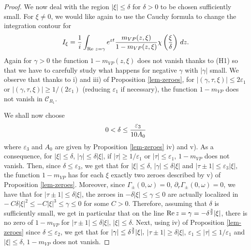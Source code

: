 \documentclass[11pt]{amsart}
\numberwithin{equation}{section}
\newcommand{\eps}{\varepsilon}
\begin{document}
    \begin{proof}
     We now deal with the region $| \xi| \leq \delta$ for $\delta>0$ to be chosen sufficiently small.     
      For $\xi\neq 0$, we would like again to use the Cauchy formula to change the integration contour for 
     $$  I_{\xi}=  { 1 \over i } \int_{\operatorname{Re}\, z= \gamma }   e^{z t } { m_{VP}(z,\xi) \over 1-m_{VP}(z, \xi)}
   \chi \left({\xi \over \delta} \right) \, dz .$$
   Again for $\gamma >0$ the function  $1-m_{VP}(z, \xi)$ does not vanish thanks to (H1) so that
   we have to carefully study what happens for negative $\gamma$ with  $|\gamma|$ small. 
    We observe that  thanks to i) and iii) of Proposition \ref{lem-zeroes}, for $|(\gamma, \tau, \xi)| \leq 2 \eps_{1}$ or  $|(\gamma, \tau, \xi)| \geq 1/ (2\eps_{1})$ (reducing
   $\eps_{1}$ if necessary), the function
    $1-m_{VP}$ does not vanish in $\mathcal{C}_{R_{1}}$.
    
    We shall now choose
   \begin{equation}
   \label{choixdelta} 
  0 < \delta  \leq  {\eps_{3} \over  10 A_0}
   \end{equation}
   where  $\eps_{3}$ and $A_0$ are given by Proposition \ref{lem-zeroes} iv) and v). As a consequence, for $| \xi | \leq \delta$, $|\gamma| \leq \delta  | \xi| $,  if $| \tau| \geq 1/\eps_{1}$ or $|\tau| \leq \eps_{1}$, 
    $1-m_{VP}$ does not vanish.
   Then, since $\delta \leq \eps_{3}$, we get that 
    for  $| \xi | \leq \delta $,   $|\gamma| \leq \delta |\xi|$ and $|\tau \pm 1 | \leq  \eps_3 | \xi|, $
    the function  $  1-m_{VP} $ has for  each $\xi$  exactly two zeroes  described by  v) of Proposition
   \ref{lem-zeroes}. Moreover, since $\Gamma_{\pm}(0, \omega)= 0$, $\partial_{r} \Gamma_{\pm}(0, \omega)= 0$, 
     we  have that for  $|\tau \pm 1 | \leq \delta  | \xi|$,  the zeroes in  $-\delta | \xi |  \leq \gamma \leq 0$
     are actually localized in   $-\ C\delta | \xi |^2 \leq - C |\xi|^3 \leq \gamma \leq 0$ for some $C>0$.
      Therefore, assuming that $\delta$ is sufficiently small, we get in particular that on the line 
        $\operatorname{Re} z =  \gamma = - \delta^{3\over 2}|\xi|$,  there is no zero of $ 1 - m_{VP}$ for   $|\tau \pm 1| \leq \delta | \xi|$, $|\xi| \leq \delta$.
        Next, using   iv) of Proposition \ref{lem-zeroes}  since  $\delta \leq \eps_{2}$, we get that
        for  $ | \gamma | \leq \delta^{3 \over 2} | \xi|, $  $|\tau \pm 1 | \geq  \delta | \xi| $, $\eps_{1} \leq |\tau| \leq 1/\eps_{1}$ and $| \xi | \leq \delta$, 
        $1-m_{VP}$ does not vanish. 
        

\end{proof}
\end{document}
